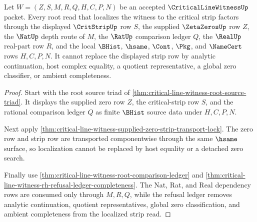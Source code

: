 \begin{theorem}
\label{thm:critical-line-witness-strip-localization}
Let $W=(Z,S,M,R,Q,H,C,P,N)$ be an accepted $\CriticalLineWitnessUp$ packet. Every root read that localizes the witness to the critical strip factors through the displayed $\CritStripUp$ row $S$, the supplied $\ZetaZerosUp$ row $Z$, the $\NatUp$ depth route of $M$, the $\RatUp$ comparison ledger $Q$, the $\RealUp$ real-part row $R$, and the local $\BHist$, $\hsame$, $\Cont$, $\Pkg$, and $\NameCert$ rows $H,C,P,N$. It cannot replace the displayed strip row by analytic continuation, host complex equality, a quotient representative, a global zero classifier, or ambient completeness.
\end{theorem}
\begin{proof}
Start with the root source triad of \autoref{thm:critical-line-witness-root-source-triad}. It displays the supplied zero row $Z$, the critical-strip row $S$, and the rational comparison ledger $Q$ as finite $\BHist$ source data under $H,C,P,N$.

Next apply \autoref{thm:critical-line-witness-supplied-zero-strip-transport-lock}. The zero row and strip row are transported componentwise through the same $\hsame$ surface, so localization cannot be replaced by host equality or a detached zero search.

Finally use \autoref{thm:critical-line-witness-root-comparison-ledger} and \autoref{thm:critical-line-witness-rh-refusal-ledger-completeness}. The Nat, Rat, and Real dependency rows are consumed only through $M,R,Q$, while the refusal ledger removes analytic continuation, quotient representatives, global zero classification, and ambient completeness from the localized strip read.
\end{proof}


